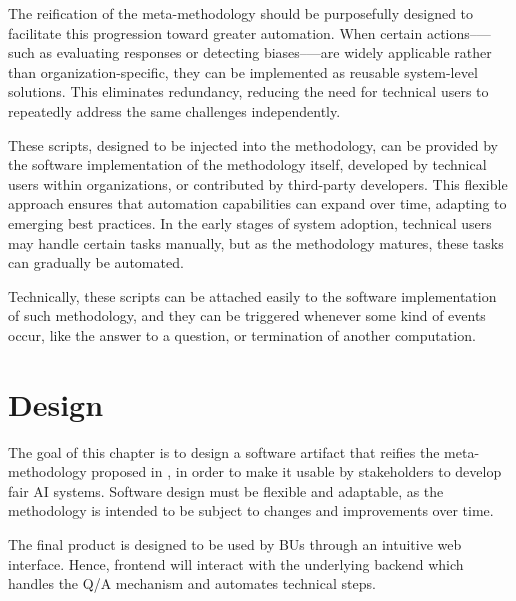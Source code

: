 \documentclass[12pt,a4paper,openright,twoside]{book}
\begin{document}
The reification of the meta-methodology should be purposefully designed to facilitate this progression toward greater automation. 
%
When certain actions--—such as evaluating responses or detecting biases--—are widely applicable rather than organization-specific, they can be implemented as reusable system-level solutions.
%
This eliminates redundancy, reducing the need for technical users to repeatedly address the same challenges independently.

These scripts, designed to be injected into the methodology, can be provided by the software implementation of the methodology itself, developed by technical users within organizations, or contributed by third-party developers.
%
This flexible approach ensures that automation capabilities can expand over time, adapting to emerging best practices.
%
In the early stages of system adoption, technical users may handle certain tasks manually, but as the methodology matures, these tasks can gradually be automated.

Technically, these scripts can be attached easily to the  software implementation of such methodology, and they can be triggered whenever some kind of events occur, like the answer to a question, or termination of another computation.



\chapter{Design}%
\label{chap:design}


The goal of this chapter is to design a software artifact that reifies the meta-methodology proposed in , 
in order to make it usable by stakeholders to develop fair \ac{AI} systems.
%
Software design must be flexible and adaptable, as the methodology is intended to be subject to changes and improvements over time.

The final product is designed to be used by \acfp{BU} through an intuitive web interface.
%
Hence, frontend will interact with the underlying backend which handles the \ac{Q/A} mechanism and automates technical steps.
\end{document}
